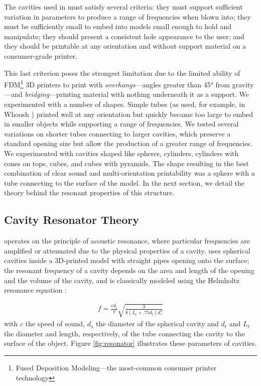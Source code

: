     The cavities used in \bh must satisfy several criteria: they must support
    sufficient variation in parameters to produce a range of frequencies when
    blown into; they must be sufficiently small to embed into models small
    enough to hold and manipulate; they should present a consistent hole
    appearance to the user; and they should be printable at any orientation and
    without support material on a consumer-grade printer.
    
    This last criterion poses the strongest limitation due to the limited
    ability of FDM\footnote{Fused Deposition Modeling---the most-common consumer
    printer technology} 3D printers to print with \textit{overhangs}---angles
    greater than 45° from gravity---and \textit{bridging}---printing
    material with nothing underneath it as a support. We experimented with a
    number of shapes. Simple tubes (as used, for example, in Whoosh
    \cite{Reyes:2016iy}) printed well at any orientation but quickly became too
    large to embed in smaller objects while supporting a range of frequencies.
    We tested several variations on shorter tubes connecting to larger cavities,
    which preserve a standard opening size but allow the production of a greater
    range of frequencies. We experimented with cavities shaped like spheres,
    cylinders, cylinders with cones on tops, cubes, and cubes with pyramids. The
    shape resulting in the best combination of clear sound and multi-orientation
    printability was a sphere with a tube connecting to the surface of the
    model. In the next section, we detail the theory behind the resonant
    properties of this structure.

    \subsection{Cavity Resonator Theory}
      \bh operates on the principle of acoustic resonance, where particular
      frequencies are amplified or attenuated due to the physical properties of
      a cavity. \bh uses spherical cavities inside a 3D-printed model with
      straight pipes opening onto the surface; the resonant frequency of a
      cavity depends on the area and length of the opening and the volume of the
      cavity, and is classically modeled using the Helmholtz resonance equation
      \cite{Helmholtz:1885vp}:

      \begin{align}\label{eq:hhz}
        f = \frac{cd_t}{\pi}\sqrt{\frac{3}{8(L_t+.75 d_t)d_s^3}}
      \end{align}
      with $c$ the speed of sound, $d_s$ the diameter of the spherical cavity
      and $d_t$ and $L_t$ the diameter and length, respectively, of the tube
      connecting the cavity to the surface of the object. Figure \ref{fig:resonator}
      illustrates these parameters of \bh cavities.
      
